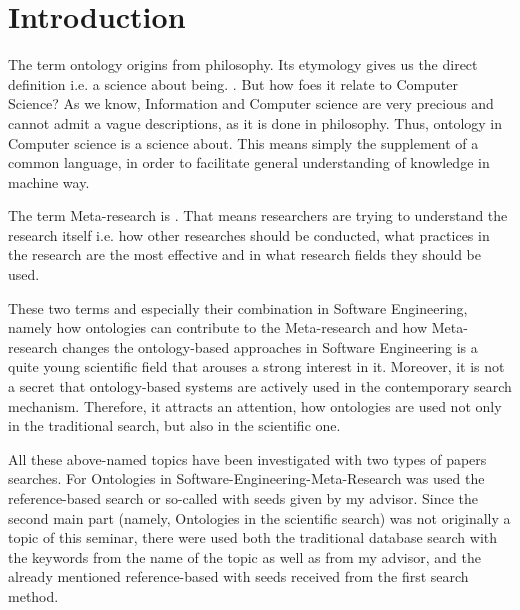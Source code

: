 
\section{Introduction}
\label{ch:Introduction}
The term ontology origins from philosophy. Its etymology gives us the direct definition i.e. a science about being. . But how foes it relate to Computer Science? As we know, Information and Computer science are very precious and cannot admit a vague descriptions, as it is done in philosophy. Thus, ontology in Computer science is a science about. This means simply the supplement of a common language, in order to facilitate general understanding of knowledge in machine way. 

The term Meta-research is . That means researchers are trying to understand the research itself i.e. how other researches should be conducted, what practices in the research are the most effective and in what research fields they should be used. 

These two terms and especially their combination in Software Engineering, namely how ontologies can contribute to the Meta-research and how Meta-research changes the ontology-based approaches in Software Engineering is a quite young scientific field that arouses a strong interest in it. Moreover, it is not a secret that ontology-based systems are actively used in the contemporary search mechanism. Therefore, it attracts an attention, how ontologies are used not only in the traditional search, but also in the scientific one.

All these above-named topics have been investigated with two types of papers searches. For Ontologies in Software-Engineering-Meta-Research was used the reference-based search or so-called \frqq\cite{Woh14} with seeds given by my advisor. Since the second main part (namely, Ontologies in the scientific search) was not originally a topic of this seminar, there were used both the traditional database search with the keywords from the name of the topic as well as from my advisor, and the already mentioned reference-based with seeds received from the first search method.

